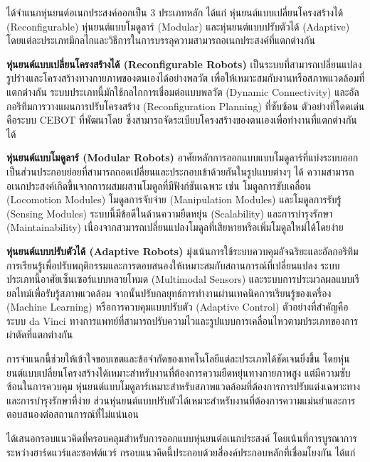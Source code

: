 \documentclass[a4paper]{article}
\begin{document}
\textcite{hameed2017modular} ได้จำแนกหุ่นยนต์อเนกประสงค์ออกเป็น 3 ประเภทหลัก ได้แก่ หุ่นยนต์แบบเปลี่ยนโครงสร้างได้ (Reconfigurable) หุ่นยนต์แบบโมดูลาร์ (Modular) และหุ่นยนต์แบบปรับตัวได้ (Adaptive) โดยแต่ละประเภทมีกลไกและวิธีการในการบรรลุความสามารถอเนกประสงค์ที่แตกต่างกัน

\textbf{หุ่นยนต์แบบเปลี่ยนโครงสร้างได้ (Reconfigurable Robots)} เป็นระบบที่สามารถเปลี่ยนแปลงรูปร่างและโครงสร้างทางกายภาพของตนเองได้อย่างพลวัต เพื่อให้เหมาะสมกับงานหรือสภาพแวดล้อมที่แตกต่างกัน \parencite{bi2016survey} ระบบประเภทนี้มักใช้กลไกการเชื่อมต่อแบบพลวัต (Dynamic Connectivity) และอัลกอริทึมการวางแผนการปรับโครงสร้าง (Reconfiguration Planning) ที่ซับซ้อน ตัวอย่างที่โดดเด่นคือระบบ CEBOT ที่พัฒนาโดย \textcite{fukuda1991dynamically} ซึ่งสามารถจัดระเบียบโครงสร้างของตนเองเพื่อทำงานที่แตกต่างกันได้

\textbf{หุ่นยนต์แบบโมดูลาร์ (Modular Robots)} อาศัยหลักการออกแบบแบบโมดูลาร์ที่แบ่งระบบออกเป็นส่วนประกอบย่อยที่สามารถถอดเปลี่ยนและประกอบเข้าด้วยกันในรูปแบบต่างๆ ได้ \parencite{post2023modular} ความสามารถอเนกประสงค์เกิดขึ้นจากการผสมผสานโมดูลที่มีฟังก์ชันเฉพาะ เช่น โมดูลการขับเคลื่อน (Locomotion Modules) โมดูลการจับจ่าย (Manipulation Modules) และโมดูลการรับรู้ (Sensing Modules) ระบบนี้มีข้อดีในด้านความยืดหยุ่น (Scalability) และการบำรุงรักษา (Maintainability) เนื่องจากสามารถเปลี่ยนแปลงโมดูลที่เสียหายหรือเพิ่มโมดูลใหม่ได้โดยง่าย

\textbf{หุ่นยนต์แบบปรับตัวได้ (Adaptive Robots)} มุ่งเน้นการใช้ระบบควบคุมอัจฉริยะและอัลกอริทึมการเรียนรู้เพื่อปรับพฤติกรรมและการตอบสนองให้เหมาะสมกับสถานการณ์ที่เปลี่ยนแปลง \parencite{thuruthel2021survey} ระบบประเภทนี้อาศัยเซ็นเซอร์แบบหลายโหมด (Multimodal Sensors) และระบบการประมวลผลแบบเรียลไทม์เพื่อรับรู้สภาพแวดล้อม จากนั้นปรับกลยุทธ์การทำงานผ่านเทคนิคการเรียนรู้ของเครื่อง (Machine Learning) หรือการควบคุมแบบปรับตัว (Adaptive Control) ตัวอย่างที่สำคัญคือระบบ da Vinci ทางการแพทย์ที่สามารถปรับความไวและรูปแบบการเคลื่อนไหวตามประเภทของการผ่าตัดที่แตกต่างกัน

การจำแนกนี้ช่วยให้เข้าใจขอบเขตและข้อจำกัดของเทคโนโลยีแต่ละประเภทได้ชัดเจนยิ่งขึ้น โดยหุ่นยนต์แบบเปลี่ยนโครงสร้างได้เหมาะสำหรับงานที่ต้องการความยืดหยุ่นทางกายภาพสูง แต่มีความซับซ้อนในการควบคุม หุ่นยนต์แบบโมดูลาร์เหมาะสำหรับสภาพแวดล้อมที่ต้องการการปรับแต่งเฉพาะทางและการบำรุงรักษาที่ง่าย ส่วนหุ่นยนต์แบบปรับตัวได้เหมาะสำหรับงานที่ต้องการความแม่นยำและการตอบสนองต่อสถานการณ์ที่ไม่แน่นอน \parencite{liang2025decoding}

\textcite{seo2019modular} ได้เสนอกรอบแนวคิดที่ครอบคลุมสำหรับการออกแบบหุ่นยนต์อเนกประสงค์ โดยเน้นที่การบูรณาการระหว่างฮาร์ดแวร์และซอฟต์แวร์ กรอบแนวคิดนี้ประกอบด้วยสี่องค์ประกอบหลักที่เชื่อมโยงกัน ได้แก่
\end{document}
